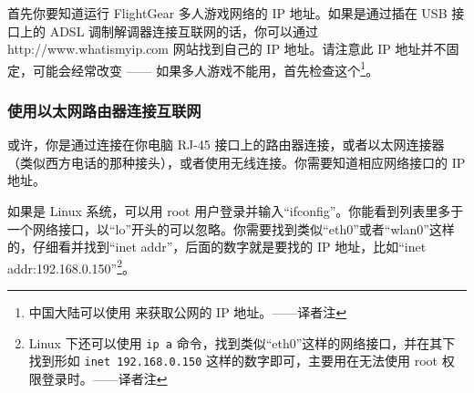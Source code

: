 首先你要知道运行 FlightGear 多人游戏网络的 IP 地址。如果是通过插在 USB 接口上的 ADSL 调制解调器连接互联网的话，你可以通过 http://www.whatismyip.com 网站找到自己的 IP 地址。请注意此 IP 地址并不固定，可能会经常改变 —— 如果多人游戏不能用，首先检查这个\footnote{中国大陆可以使用  来获取公网的 IP 地址。——译者注}。
\fi
\iffalse
\IfLanguageName{english}{
\subsubsection{Those using a USB modem to connect to the Internet}

First of all, you need to know the IP address of the network interface you're going to be running FG multiplayer over.
If your Internet connection is via an ADSL modem that plugs directly into your computer with a USB connection, you
should be able to find your IP address by visiting http://www.whatismyip.com . Please note that this address may very well
change every now and again - if MP stops working, check this first.
}{}
\fi
{}

\ifchinese
\subsubsection{使用以太网路由器连接互联网}

或许，你是通过连接在你电脑 RJ-45 接口上的路由器连接，或者以太网连接器（类似西方电话的那种接头），或者使用无线连接。你需要知道相应网络接口的 IP 地址。

如果是 Linux 系统，可以用 root 用户登录并输入“ifconfig”。你能看到列表里多于一个网络接口，以“lo”开头的可以忽略。你需要找到类似“eth0”或者“wlan0”这样的，仔细看并找到“inet addr”，后面的数字就是要找的 IP 地址，比如“inet addr:192.168.0.150”\footnote{Linux 下还可以使用 \texttt{ip a} 命令，找到类似“eth0”这样的网络接口，并在其下找到形如 \texttt{inet 192.168.0.150} 这样的数字即可，主要用在无法使用 root 权限登录时。——译者注}。

